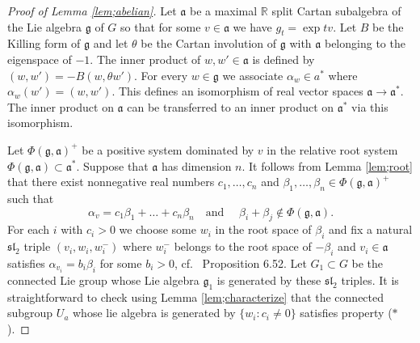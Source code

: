 \documentclass[12pt]{amsart}
\theoremstyle{definition}
\theoremstyle{remark}
\numberwithin{equation}{section}
\begin{document}
\begin{proof}[Proof of Lemma \ref{lem;abelian}]
Let $\mathfrak a$ be a maximal $\mathbb R$ split Cartan  subalgebra of the Lie algebra $\mathfrak g$ of 
$G$ so that for some 
  $v\in \mathfrak a$ we have  $g_t=\exp tv$.
  Let $B$ be the Killing form of $\mathfrak g$ and let $\theta$
  be the Cartan involution of $\mathfrak g$ with $\mathfrak a$ belonging to the eigenspace of $-1$.
  The inner product of $w, w'\in \mathfrak a$ is defined by 
  $(w, w')=-B(w, \theta w')$. 
  For every $w\in \mathfrak g$ we associate $\alpha_w\in a^*$ where
$\alpha_w(w')=(w, w')$.
This defines an isomorphism of real vector spaces $\mathfrak a\to \mathfrak a^*$.
The inner product on $\mathfrak a$ can be transferred to 
 an inner product on $\mathfrak a^*$ via this isomorphism. 
 
  
Let    $\Phi(\mathfrak g, \mathfrak a) ^+$ be a positive system dominated by $v$
in the relative  root system
$\Phi(\mathfrak g, \mathfrak a) \subset \mathfrak a^*$. 
Suppose that $\mathfrak a$ has dimension $n$. 
It follows from Lemma \ref{lem;root} that there exist nonnegative real numbers  $c_1, \ldots, c_n$
and $\beta_1,\ldots,  \beta_n  \in \Phi(\mathfrak g, \mathfrak a)^+$ such that 
\[
\alpha_v=c_1\beta_1+\ldots+c_n\beta_n\quad \mbox{and }\quad
\beta_i+\beta_j\not\in \Phi(\mathfrak g, \mathfrak a).
\] 
For each $i$ with $c_i>0$ we choose some $w_i$ in the root space of  $\beta_i$
and fix a natural  $\mathfrak {sl}_2$ triple  $(v_i, w_i, w_i^-)$ where $w_i^-$ belongs
to the root space of $-\beta_i$ and $v_i\in \mathfrak a$ satisfies $\alpha_{v_i}=b_i\beta_i$
for some $b_i> 0$, cf.~\cite{knapp} Proposition 6.52.
Let  $G_1\subset G$ be the connected Lie group whose 
 Lie algebra $\mathfrak g_1 $ is generated by 
these $\mathfrak {sl}_2$ triples. 
It is straightforward to check using Lemma \ref{lem;characterize} that 
  the connected  subgroup $U_a$ whose  lie algebra is generated by 
 $\{w_i: c_i\neq 0\}$ satisfies property ($*$).
\end{proof}
\end{document}
